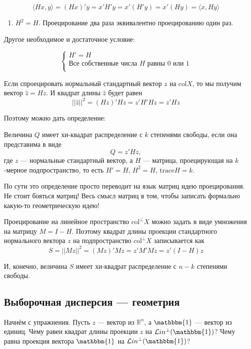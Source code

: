 \documentclass[11pt,russian,]{article}
\providecommand{\tightlist}{%
  \setlength{\itemsep}{0pt}\setlength{\parskip}{0pt}}
\newcommand{\RR}{\mathbb{R}}
\renewcommand{\Rn}{\RR^n}
\newcommand{\1}{\mathbbm{1}}
\newcommand{\Lin}{\mathcal{L}in}
\newcommand{\Linp}{\Lin^{\perp}}
\newcommand{\col}{\mathcal{col}}
\newcommand{\colp}{\col^{\perp}}
\renewcommand{\col}{\mathrm{col}}
\newcommand{\trace}{\mathrm{trace}}
\begin{document}
\[
\langle Hx, y\rangle = (Hx)'y = x' H' y = x' (H'y) = x' (Hy) = \langle x, Hy \rangle
\]

\begin{enumerate}
\def\labelenumi{\arabic{enumi}.}
\setcounter{enumi}{1}
\tightlist
\item
  \(H^2=H\). Проецирование два раза эквивалентно проецированию один раз.
\end{enumerate}

Другое необходимое и достаточное условие:

\[
\begin{cases}
H' = H \\
\text{Все собственные числа } H \text{ равны } 0 \text{ или } 1\\
\end{cases}
\]

Если спроецировать нормальный стандартный вектор \(z\) на \(\col X\), то
мы получим вектор \(\hat z = Hz\). И квадрат длины \(\hat z\) будет
равен \[
||\hat z ||^2 = (Hz)'Hz=z'H'Hz = z'Hz
\]

Поэтому можно дать определение:

Величина \(Q\) имеет хи-квадрат распределение с \(k\) степенями свободы,
если она представима в виде \[
Q = z'Hz,
\] где \(z\) --- нормальные стандартный вектор, а \(H\) --- матрица,
проецирующая на \(k\)-мерное подпространство, то есть \(H'=H\),
\(H^2=H\), \(\trace H = k\).

По сути это определение просто переводит на язык матриц идею
проецирования. Не стоит бояться матриц! Весь смысл матриц в том, чтобы
записать формально какую-то геометрическую идею!

Проецирование на линейное пространство \(\colp X\) можно задать в виде
умножения на матрицу \(M = I - H\). Поэтому квадрат длины проекции
стандартного нормального вектора \(z\) на подпространство \(\colp X\)
записывается как \[
S = ||Mz||^2 = (Mz)'Mz=z'M'Mz=z'(I-H)z
\]

И, конечно, величина \(S\) имеет хи-квадрат распределение с \(n-k\)
степенями свободы.

\subsection{Выборочная дисперсия --- геометрия}\label{--}

Начнём с упражнения. Пусть \(z\) --- вектор из \(\Rn\), а \(\1\) ---
вектор из единиц. Чему равен квадрат длины проекции \(z\) на
\(\Linp(\1)\)? Чему равна проекция вектора \(\1\) на \(\Linp(\1)\)?
\end{document}
